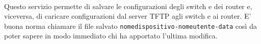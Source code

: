 \paragraph{} Questo servizio permette di salvare le configurazioni degli switch e dei router e, viceversa, di caricare configurazioni dal server TFTP agli switch e ai router. E' buona norma chiamare il file salvato {\tt nomedispositivo-nomeutente-data} così da poter sapere in modo immediato chi ha apportato l'ultima modifica. 



